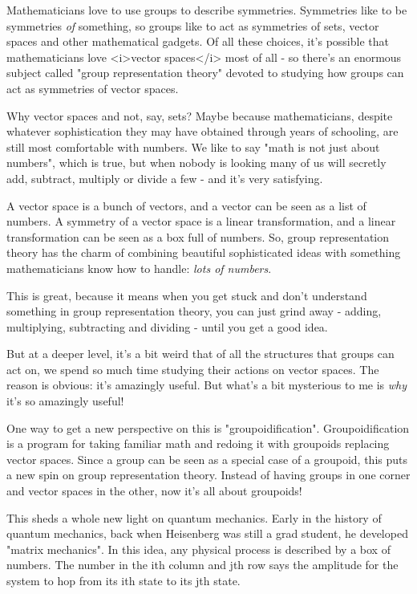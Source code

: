 


Mathematicians love to use groups to describe symmetries.  Symmetries
like to be symmetries \emph{of} something, so groups like to act as
symmetries of sets, vector spaces and other mathematical gadgets.  Of
all these choices, it's possible that mathematicians love <i>vector
spaces</i> most of all - so there's an enormous subject called
"group representation theory" devoted to studying how groups
can act as symmetries of vector spaces.

Why vector spaces and not, say, sets?  Maybe because mathematicians, 
despite whatever sophistication they may have obtained through years 
of schooling, are still most comfortable with numbers.  We like to say 
"math is not just about numbers", which is true, but when nobody is 
looking many of us will secretly add, subtract, multiply or divide a 
few - and it's very satisfying.  

A vector space is a bunch of vectors, and a vector can be seen as a list 
of numbers.  A symmetry of a vector space is a linear transformation, 
and a linear transformation can be seen as a box full of numbers.  
So, group representation theory has the charm of combining beautiful
sophisticated ideas with something mathematicians know how to handle: 
\emph{lots of numbers}.

This is great, because it means when you get stuck and don't understand 
something in group representation theory, you can just grind away - 
adding, multiplying, subtracting and dividing - until you get a good 
idea.  

But at a deeper level, it's a bit weird that of all the structures
that groups can act on, we spend so much time studying their actions
on vector spaces.  The reason is obvious: it's amazingly useful.  But
what's a bit mysterious to me is \emph{why} it's so amazingly useful!

One way to get a new perspective on this is "groupoidification".
Groupoidification is a program for taking familiar math and 
redoing it with groupoids replacing vector spaces.  Since a group
can be seen as a special case of a groupoid, this puts a new spin
on group representation theory.  Instead of having groups in one
corner and vector spaces in the other, now it's all about groupoids!

This sheds a whole new light on quantum mechanics.  Early in the
history of quantum mechanics, back when Heisenberg was still
a grad student, he developed "matrix mechanics".  In this idea,
any physical process is described by a box of numbers.  The 
number in the ith column and jth row says the amplitude 
for the system to hop from its ith state to its jth state.  

